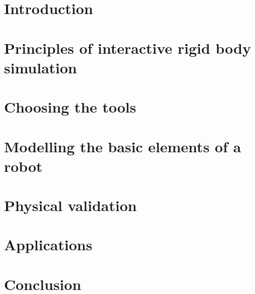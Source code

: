 \documentclass[12pt,a4paper]{report}
\begin{document}


\tableofcontents

\listoffigures

\listoftables

\clearpage
\setcounter{page}{1}
\chapter{Introduction}


\chapter{Principles of interactive rigid body simulation}
\label{principles}


\chapter{Choosing the tools}
\label{choice}


\chapter{Modelling the basic elements of a robot}
\label{tools}


\chapter{Physical validation}
\label{physical_val}


\chapter{Applications}
\label{simulation}


\chapter{Conclusion}
\label{conclusion}





\appendix

\end{document}
